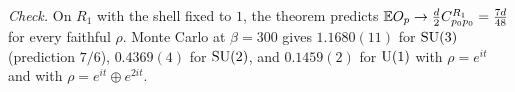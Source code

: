 \emph{Check.} On $R_1$ with the shell fixed to $1$, the theorem predicts $\mathbb{E} O_p\to\frac d2C^{R_1}_{p_0p_0}=\frac{7d}{48}$ for every faithful $\rho$. Monte Carlo at $\beta=300$ gives $1.1680(11)$ for $\mathrm{SU}(3)$ (prediction $7/6$), $0.4369(4)$ for $\mathrm{SU}(2)$, and $0.1459(2)$ for $\mathrm{U}(1)$ with $\rho=e^{it}$ and with $\rho=e^{it}\oplus e^{2it}$.

